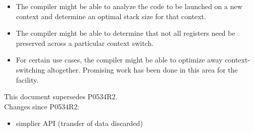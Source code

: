 \documentclass[fontsize=10pt,paper=A4,pagesize,DIV=15]{scrartcl}
\begin{document}
\begin{itemize}
  \item The compiler might be able to analyze the code to be launched on a new
    \cc context and determine an optimal stack size for that context.
  \item The compiler might be able to determine that not all registers need be
    preserved across a particular context switch.
  \item For certain use cases, the compiler might be able to optimize away
    context-switching altogether. Promising work has been done in this area
    for the \coawait facility.\cite{N4649}
\end{itemize}

This document supersedes P0534R2.\cite{P0534R2}\\
\newline
Changes since P0534R2:

\begin{itemize}
    \item simplier API (transfer of data discarded)
\end{itemize}












\end{document}
